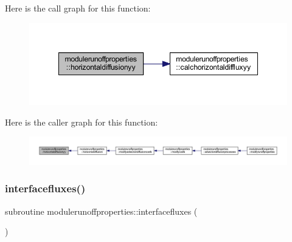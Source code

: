 Here is the call graph for this function\+:\nopagebreak
\begin{figure}[H]
\begin{center}
\leavevmode
\includegraphics[width=348pt]{namespacemodulerunoffproperties_a4725654ec67f2fac23c7df49fb984a0e_cgraph}
\end{center}
\end{figure}
Here is the caller graph for this function\+:\nopagebreak
\begin{figure}[H]
\begin{center}
\leavevmode
\includegraphics[width=350pt]{namespacemodulerunoffproperties_a4725654ec67f2fac23c7df49fb984a0e_icgraph}
\end{center}
\end{figure}
\mbox{\label{namespacemodulerunoffproperties_a076e539417a822f7177b60e8449345e3}} 
\subsubsection{\texorpdfstring{interfacefluxes()}{interfacefluxes()}}
{\footnotesize\ttfamily subroutine modulerunoffproperties\+::interfacefluxes (\begin{DoxyParamCaption}{ }\end{DoxyParamCaption})\hspace{0.3cm}{\ttfamily [private]}}

